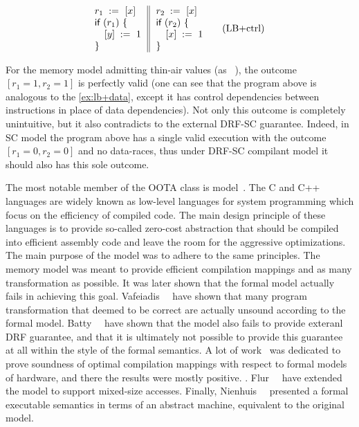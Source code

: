 \begin{equation*}
\inarrII{
  \readInst{}{r_1}{x}      \\
  \kw{if} {(r_1)} ~\{      \\
  \quad\writeInst{}{y}{1}  \\
  \}
}{
  \readInst{}{r_2}{x}      \\
  \kw{if} {(r_2)} ~\{      \\
  \quad\writeInst{}{x}{1}  \\
  \}
}
\tag{LB+ctrl}\label{ex:lb+ctrl}
\end{equation*}

For the memory model admitting thin-air values 
(as \eg \CMM~\cite{Batty-al:POPL11}), 
the outcome $[r_1=1, r_2=1]$ is perfectly valid
(one can see that the program above is analogous 
to the \ref{ex:lb+data}, except it has 
control dependencies between instructions 
in place of data dependencies).
Not only this outcome is completely unintuitive,
but it also contradicts to the external DRF-SC guarantee.
Indeed, in SC model the program above has 
a single valid execution with the outcome $[r_1=0, r_2=0]$ 
and no data-races, thus under DRF-SC compilant model 
it should also has this sole outcome.  

The most notable member of the OOTA class is \CMM model~\cite{Batty-al:POPL11}.
The C and C++ languages are widely known as low-level languages 
for system programming which focus on the efficiency of compiled code. 
The main design principle of these languages is to provide
so-called zero-cost abstraction that should be compiled 
into efficient assembly code and leave the room 
for the aggressive optimizations. 
The main purpose of the \CMM model was to adhere 
to the same principles. The memory model 
was meant to provide efficient compilation mappings 
and as many transformation as possible.
It was later shown that the formal model actually 
fails in achieving this goal. 
Vafeiadis~\etal~\cite{Vafeiadis-al:POPL15} have shown
that many program transformation that deemed to be correct
are actually unsound according to the formal model. 
Batty~\etal~\cite{Batty-al:ESOP15} have shown that 
the model also fails to provide exteranl DRF guarantee, 
and that it is ultimately not possible to provide this guarantee
at all within the style of the \CMM formal semantics.
A lot of work~\cite{Batty-al:POPL11, Sarkar-al:PLDI12, Batty-al:POPL12, Batty-el:POPL16} 
was dedicated to prove soundness of optimal compilation mappings 
with respect to formal models of hardware, 
and there the results were mostly positive.
. 
Flur~\etal~\cite{Flur-el:POPL17} have extended the model 
to support mixed-size accesses.
Finally, Nienhuis~\etal~\cite{Nienhuis-el:OOPSLA16} presented 
a formal executable semantics in terms of an abstract machine, 
equivalent to the original \CMM model. 

